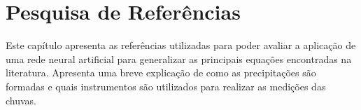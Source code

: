 \chapter{Pesquisa de Referências}

Este capítulo apresenta as referências utilizadas para poder avaliar a aplicação de uma rede neural artificial para generalizar as principais equações encontradas na literatura. Apresenta uma breve explicação de como as precipitações são formadas e quais instrumentos são utilizados para realizar as medições das chuvas. 




















